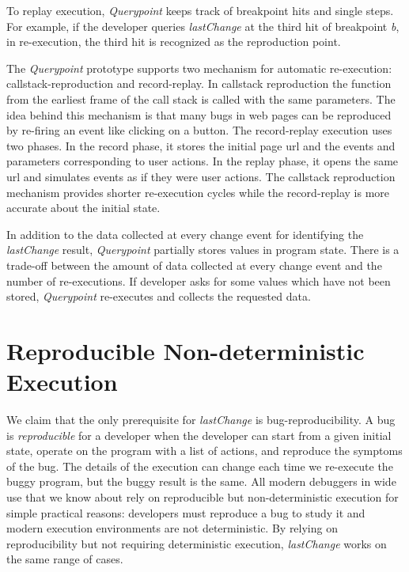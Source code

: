 \documentclass{sig-alternate}
\begin{document}
To replay execution, \textit{Querypoint} keeps track of breakpoint hits and single steps. For example, 
if the developer queries \textit{lastChange} at the third hit of breakpoint \textit{b}, in
re-execution, the third hit is recognized as the reproduction point. 

The \textit{Querypoint} prototype supports two mechanism
for automatic re-execution: callstack-reproduction and record-replay. In callstack reproduction the function from
the earliest frame of the call stack is called with the same parameters. The idea
behind this mechanism is that many bugs in web pages can be reproduced by re-firing
an event like clicking on a button. The record-replay execution uses two phases. In the record phase, it 
stores the initial page url and the events and parameters corresponding to user actions. In the replay phase, it opens
the same url and simulates events as if they were user actions. The callstack reproduction mechanism provides
shorter re-execution cycles while the record-replay is more accurate about the
initial state.

In addition to the data collected at every change event for identifying the \textit{lastChange}
result, \textit{Querypoint} partially stores values in program state. There is a trade-off between the amount of data collected at every change event and the number of re-executions. If developer asks for 
some values which have not been stored, \textit{Querypoint} re-executes and collects the requested data. 



\section{Reproducible Non-deterministic Execution}
We claim that the only prerequisite for \textit{lastChange}  is bug-reproducibility. 
A bug is \textit{reproducible} for a developer when the developer can
start from a given initial state, operate on the program with a
list of actions, and reproduce the symptoms of the bug. The details of
the execution can change each time we re-execute the buggy program,
but the buggy result is the same.  All modern debuggers in wide use that we know 
about rely on reproducible but non-deterministic execution for simple practical reasons: 
developers must reproduce a bug to study it and modern execution environments 
are not deterministic.  
By relying on reproducibility but 
not requiring deterministic execution, \textit{lastChange} works on the same range of cases.
\end{document}
